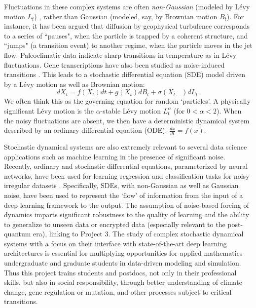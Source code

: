 \documentclass[11pt]{NSFamsart}
\begin{document}
Fluctuations in these complex systems are often \emph{non-Gaussian} (modeled by L\'evy motion $L_t$) \cite{Woy,Dit, Shlesinger,taqqu,dybiec2009levy}, rather than Gaussian (modeled, say, by Brownian motion $B_t$). For instance, it has been argued that diffusion by geophysical turbulence \cite{Shlesinger}
corresponds  to a series of  ``pauses", when the
particle is trapped by a coherent structure, and  
``jumps" (a transition event) to another regime, when the particle moves in the jet
flow. Paleoclimatic data \cite{Dit, ZhengYY2020}   indicate   sharp transitions in temperature as in L\'evy fluctuations. Gene transcriptions have also been studied as noise-induced transitions \cite{Raser2005,Suel06,Lin2016GeneED, ChenWuDuan}. 
This leads to a
 stochastic   differential equation (SDE)  model \cite{Arnold,   Oksendal, DuanBook2015, Applebaum}
 driven by a L\'evy motion as well as Brownian motion:
 $$
 dX_t= f(X_t) dt + g(X_t) dB_t + \sigma(X_{t-}) dL_t.
 $$
 We often think this as the governing equation for random `particles'. A physically significant L\'evy motion is the  $\alpha$-stable L\'evy motion $L_t^\alpha$ (for $0<\alpha<2$).  
 When the noisy fluctuations are absent, we then have a   deterministic  dynamical system described by an ordinary differential equation (ODE): $ \frac{dx}{dt}=f(x).$
 
 
Stochastic dynamical systems are also extremely relevant to several data science applications such as machine learning in the presence of significant noise. Recently, ordinary and stochastic differential equations, parameterized by neural networks, have been used for learning regression and classification tasks for noisy irregular datasets \cite{chen2018neural,rubanova2019latent,jia2019neural,tzen2019neural,look2020deterministic,liu2019neural}. Specifically, SDEs, with non-Gaussian as well as Gaussian noise, have been used to represent the `flow' of information from the input of a deep learning framework to the output. The assumption of noise-based forcing of dynamics imparts significant robustness to the quality of learning and the ability to generalize to unseen data or encrypted data (especially relevant to the post-quantum era), linking to Project 3. The study of complex stochastic dynamical systems with a focus on their interface with state-of-the-art deep learning architectures is essential for multiplying opportunities for applied mathematics undergraduate and graduate students in data-driven modeling and simulation. 
Thus this project   trains students and postdocs, not only in their professional skills,  but also in social responsibility, through better understanding of climate change, gene regulation or mutation,  and other processes subject to critical transitions.
\end{document}
